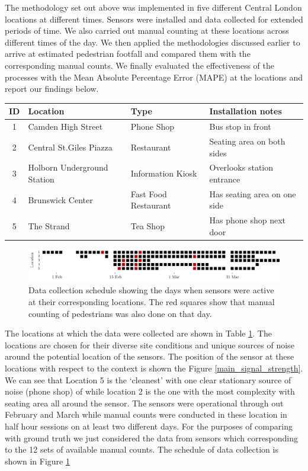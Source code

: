 The methodology set out above was implemented in five different Central
London locations at different times. Sensors were installed and data collected
for extended periods of time. We also carried out manual counting at these
locations across different times of the day. We then applied the methodologies
discussed earlier to arrive at estimated pedestrian footfall and compared them
with the corresponding manual counts.  We finally evaluated the effectiveness of the
processes with the Mean Absolute Percentage Error (MAPE) at the locations and
report our findings below.

\begin{table}
	{\begin{tabular}{clll} 
		\toprule
		 ID & Location & Type & Installation notes\\
		 \midrule
		 1 & Camden High Street & Phone Shop & Bus stop in front\\
		 2 & Central St.Giles Piazza & Restaurant & Seating area on both sides\\
		 3 & Holborn Underground Station & Information Kiosk & Overlooks station entrance\\
		 4 & Brunswick Center & Fast Food Restaurant & Has seating area on one side\\
		 5 & The Strand & Tea Shop & Has phone shop next door \\
		 \bottomrule
	\end{tabular}}
	\label{locations-table}
\end{table}

\begin{figure}
	\begin{center}
		\includegraphics [width=0.90\linewidth] {images/main_schedule.jpeg}
		\caption{Data collection schedule showing the days when sensors were active at their corresponding locations. The red squares show that manual counting of pedestrians was also done on that day.}
		\label{main_schedule}
	\end{center}
\end{figure}

The locations at which the data were collected are shown in Table
\ref{locations-table}. The locations are chosen for their diverse site
conditions and unique sources of noise around the potential location of the
sensors. The position of the sensor at these locations with respect to the
context is shown the Figure \ref{main_signal_strength}. We can see that Location
5 is the `cleanest' with one clear stationary source of noise (phone shop) of
while location 2 is the one with the most complexity with seating area all
around the sensor.  The sensors were operational through out February and March
while manual counts were conducted in these location in half hour sessions on at
least two different days. For the purposes of comparing with ground truth we
just considered the data from sensors which corresponding to the 12 sets of
available manual counts. The schedule of data collection is shown in Figure
\ref{main_schedule}

